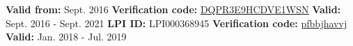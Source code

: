 %
%
%


\begin{certifications}
        {
            \textbf{Valid from:} Sept. 2016
            \textbf{Verification code:} 
                \href{https://www.certmetrics.com/comptia/public/verification.aspx?code=DQPR3E9HCDVE1WSN}
                {\underline{DQPR3E9HCDVE1WSN}}
        }
        {
            \textbf{Valid:} Sept. 2016 - Sept. 2021
            \textbf{LPI ID:} LPI000368945
            \textbf{Verification code:}
                \href{https://cs.lpi.org/caf/Xamman/certification}
                {\underline{pfbbjhavvj}}
        }
        {
            \textbf{Valid:} Jan. 2018 - Jul. 2019
        }
\end{certifications}
